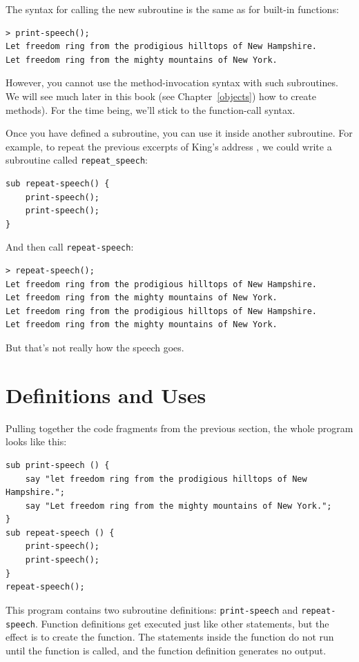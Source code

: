 The syntax for calling the new subroutine is the same as
for built-in functions:

\begin{verbatim}
> print-speech();
Let freedom ring from the prodigious hilltops of New Hampshire.
Let freedom ring from the mighty mountains of New York.
\end{verbatim}
%

However, you cannot use the method-invocation syntax with 
such subroutines. We will see much later in this book (see 
Chapter~\ref{objects}) how to create methods). For the time 
being, we'll stick to the function-call syntax.

Once you have defined a subroutine, you can use it inside another
subroutine.  For example, to repeat the previous excerpts of
King's address ,  we could write a subroutine called \verb"repeat_speech":

\begin{verbatim}
sub repeat-speech() {
    print-speech();
    print-speech();
}
\end{verbatim}
%
And then call \verb"repeat-speech":

\begin{verbatim}
> repeat-speech();
Let freedom ring from the prodigious hilltops of New Hampshire.
Let freedom ring from the mighty mountains of New York.
Let freedom ring from the prodigious hilltops of New Hampshire.
Let freedom ring from the mighty mountains of New York.
\end{verbatim}
%
But that's not really how the speech goes.


\section{Definitions and Uses}

Pulling together the code fragments from the previous section, the
whole program looks like this:

\begin{verbatim}
sub print-speech () {
    say "let freedom ring from the prodigious hilltops of New Hampshire.";
    say "Let freedom ring from the mighty mountains of New York.";
}
sub repeat-speech () {
    print-speech();
    print-speech();
}
repeat-speech();
\end{verbatim}
%
This program contains two subroutine definitions: \verb"print-speech" and
\verb"repeat-speech".  Function definitions get executed just like other
statements, but the effect is to create the function.  The statements
inside the function do not run until the function is called, and
the function definition generates no output.

